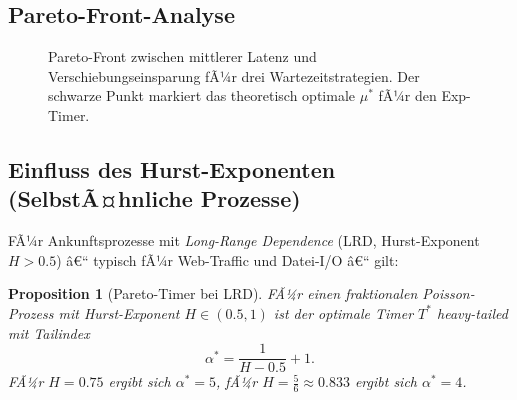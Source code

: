﻿\documentclass[12pt, a4paper]{article}
\newtheorem{proposition}[theorem]{Proposition}
\DeclareMathOperator{\E}{\mathbb{E}}
\begin{document}
\subsection{Pareto-Front-Analyse}

\begin{figure}[ht]
\centering
{}
\caption{Pareto-Front zwischen mittlerer Latenz und Verschiebungseinsparung
         fÃ¼r drei Wartezeitstrategien. Der schwarze Punkt markiert das
         theoretisch optimale $\mu^*$ fÃ¼r den Exp-Timer.}
\label{fig:paretofront}
\end{figure}

\subsection{Einfluss des Hurst-Exponenten (SelbstÃ¤hnliche Prozesse)}

FÃ¼r Ankunftsprozesse mit \emph{Long-Range Dependence} (LRD, Hurst-Exponent
$H > 0.5$) â€“ typisch fÃ¼r Web-Traffic und Datei-I/O â€“ gilt:

\begin{proposition}[Pareto-Timer bei LRD]\label{prop:lrd}
FÃ¼r einen fraktionalen Poisson-Prozess mit Hurst-Exponent $H \in (0.5, 1)$
ist der optimale Timer $T^*$ heavy-tailed mit Tailindex
\[
  \alpha^* = \frac{1}{H - 0.5} + 1.
\]
FÃ¼r $H = 0.75$ ergibt sich $\alpha^* = 5$, fÃ¼r $H = \frac{5}{6} \approx 0.833$
ergibt sich $\alpha^* = 4$.
\end{proposition}
\end{document}
